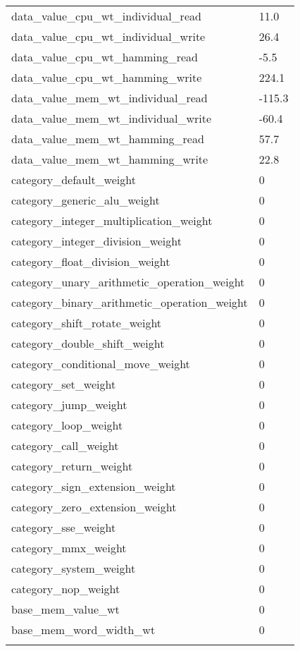 \begin{longtable}{l|l}
  data\_value\_cpu\_wt\_individual\_read & 11.0 \\
  data\_value\_cpu\_wt\_individual\_write & 26.4 \\

  data\_value\_cpu\_wt\_hamming\_read & -5.5 \\
  data\_value\_cpu\_wt\_hamming\_write & 224.1 \\

  data\_value\_mem\_wt\_individual\_read & -115.3 \\
  data\_value\_mem\_wt\_individual\_write & -60.4 \\

  data\_value\_mem\_wt\_hamming\_read & 57.7 \\
  data\_value\_mem\_wt\_hamming\_write & 22.8 \\

  category\_default\_weight & 0 \\
  category\_generic\_alu\_weight & 0 \\
  category\_integer\_multiplication\_weight & 0 \\
  category\_integer\_division\_weight & 0 \\
  category\_float\_division\_weight & 0 \\
  category\_unary\_arithmetic\_operation\_weight & 0 \\
  category\_binary\_arithmetic\_operation\_weight & 0 \\
  category\_shift\_rotate\_weight & 0 \\
  category\_double\_shift\_weight & 0 \\
  category\_conditional\_move\_weight & 0 \\
  category\_set\_weight & 0 \\
  category\_jump\_weight & 0 \\
  category\_loop\_weight & 0 \\
  category\_call\_weight & 0 \\
  category\_return\_weight & 0 \\
  category\_sign\_extension\_weight & 0 \\
  category\_zero\_extension\_weight & 0 \\
  category\_sse\_weight & 0 \\
  category\_mmx\_weight & 0 \\
  category\_system\_weight & 0 \\
  category\_nop\_weight & 0 \\

  base\_mem\_value\_wt & 0 \\
  base\_mem\_word\_width\_wt & 0 \\

  \hline \\

\end{longtable}
